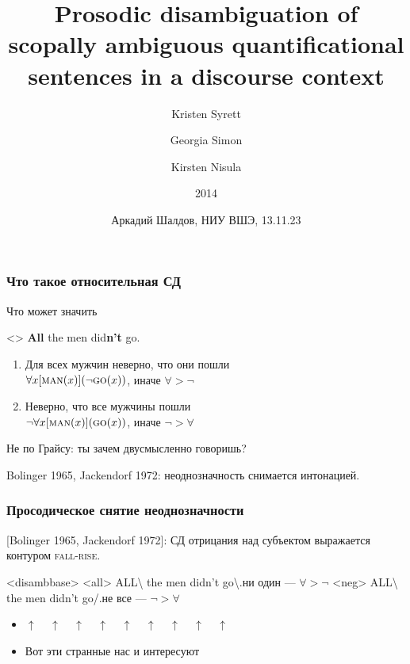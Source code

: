 \documentclass{beamer}
\title{Prosodic disambiguation of scopally ambiguous quantificational sentences in a discourse context}
\author{Kristen Syrett \and Georgia Simon \and Kirsten Nisula\and 2014}
\date{Аркадий Шалдов, НИУ ВШЭ, 13.11.23}
\begin{document}

\begin{frame}
    \titlepage
\end{frame}

\begin{frame}
    \frametitle{Что такое относительная СД}

    Что может значить

    \ex<>
        \textbf{All} the men did\textbf{n't} go.
    \xe
    \begin{enumerate}
        \item Для всех мужчин неверно, что они пошли\\
        \hfill $\forall x[\textsc{man}(x)](\neg\textsc{go}(x))$, иначе $\forall>\neg$

        \item Неверно, что все мужчины пошли\\
        \hfill $\neg\forall x[\textsc{man}(x)](\textsc{go}(x))$, иначе $\neg>\forall$
    \end{enumerate}
    
    \pause
    Не по Грайсу: ты зачем двусмысленно говоришь?

    \pause
    Bolinger 1965, Jackendorf 1972: неоднозначность снимается интонацией.
\end{frame}

\begin{frame}
    \frametitle{Просодическое снятие неоднозначности}

    [Bolinger 1965, Jackendorf 1972]: СД отрицания над субъектом выражается контуром \textsc{fall-rise}.
    
    \pex<disambbase>
        \a<all> \uppercase{All}\textbackslash{} the men didn't go\textbackslash.\hfill ни один — $\forall>\neg$
        \a<neg> \uppercase{All}\textbackslash{} the men didn't go/.\hfill не все — $\neg>\forall$
    \xe

    \pause
    

    \pause
    
    \begin{itemize}
        \item[] $\uparrow\ \ \ \ \ \uparrow\ \ \ \ \ \uparrow\ \ \ \ \ \uparrow\ \ \ \ \ \uparrow\ \ \ \ \ \uparrow\ \ \ \ \ \uparrow\ \ \ \ \ \uparrow\ \ \ \ \ \uparrow$
        \item[] Вот эти странные нас и интересуют
    
    \end{itemize}
\end{frame}
\end{document}

